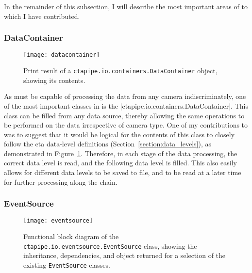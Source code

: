 In the remainder of this subsection, I will describe the most important areas of  to which I have contributed.

\subsubsection{DataContainer}

\begin{figure}
  \centering
  \texttt{[image: datacontainer]}
  \caption[Contents of the DataContainer object.]{Print result of a {\protect \lstinline{ctapipe.io.containers.DataContainer}} object, showing its contents.}
  \label{fig:datacontainer}
\end{figure}

As  must be capable of processing the data from any camera indiscriminately, one of the most important classes in  is the |ctapipe.io.containers.DataContainer|. This class can be filled from any data source, thereby allowing the same operations to be performed on the data irrespective of camera type. One of my contributions to  was to suggest that it would be logical for the contents of this class to closely follow the \gls{cta} data-level definitions (Section~\ref{section:data_levels}), as demonstrated in Figure~\ref{fig:datacontainer}. Therefore, in each stage of the data processing, the correct data level is read, and the following data level is filled. This also easily allows for different data levels to be saved to file, and to be read at a later time for further processing along the chain.

\subsubsection{EventSource}

\begin{figure}
  \centering
  \texttt{[image: eventsource]}
  \caption[Functional block diagram of the EventSource class.]{Functional block diagram of the \lstinline{ctapipe.io.eventsource.EventSource} class, showing the inheritance, dependencies, and object returned for a selection of the existing \lstinline{EventSource} classes.}
  \label{fig:eventsource}
\end{figure}

